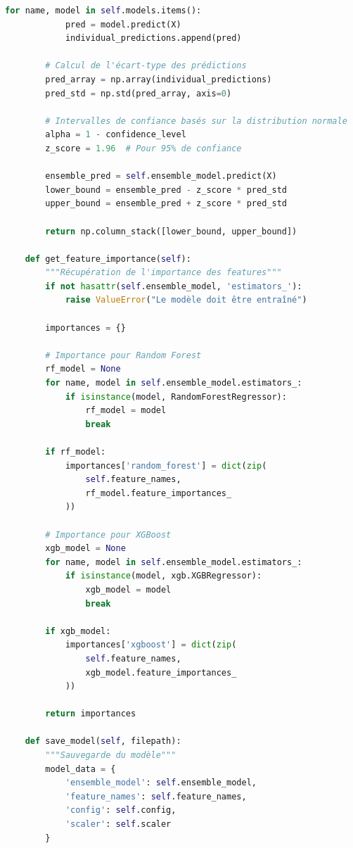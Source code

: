 \begin{lstlisting}[language=Python, caption=Classe du modèle ensemble optimisé]
        for name, model in self.models.items():
            pred = model.predict(X)
            individual_predictions.append(pred)
        
        # Calcul de l'écart-type des prédictions
        pred_array = np.array(individual_predictions)
        pred_std = np.std(pred_array, axis=0)
        
        # Intervalles de confiance basés sur la distribution normale
        alpha = 1 - confidence_level
        z_score = 1.96  # Pour 95% de confiance
        
        ensemble_pred = self.ensemble_model.predict(X)
        lower_bound = ensemble_pred - z_score * pred_std
        upper_bound = ensemble_pred + z_score * pred_std
        
        return np.column_stack([lower_bound, upper_bound])
    
    def get_feature_importance(self):
        """Récupération de l'importance des features"""
        if not hasattr(self.ensemble_model, 'estimators_'):
            raise ValueError("Le modèle doit être entraîné")
        
        importances = {}
        
        # Importance pour Random Forest
        rf_model = None
        for name, model in self.ensemble_model.estimators_:
            if isinstance(model, RandomForestRegressor):
                rf_model = model
                break
        
        if rf_model:
            importances['random_forest'] = dict(zip(
                self.feature_names, 
                rf_model.feature_importances_
            ))
        
        # Importance pour XGBoost
        xgb_model = None
        for name, model in self.ensemble_model.estimators_:
            if isinstance(model, xgb.XGBRegressor):
                xgb_model = model
                break
        
        if xgb_model:
            importances['xgboost'] = dict(zip(
                self.feature_names,
                xgb_model.feature_importances_
            ))
        
        return importances
    
    def save_model(self, filepath):
        """Sauvegarde du modèle"""
        model_data = {
            'ensemble_model': self.ensemble_model,
            'feature_names': self.feature_names,
            'config': self.config,
            'scaler': self.scaler
        }
        

\end{lstlisting}
